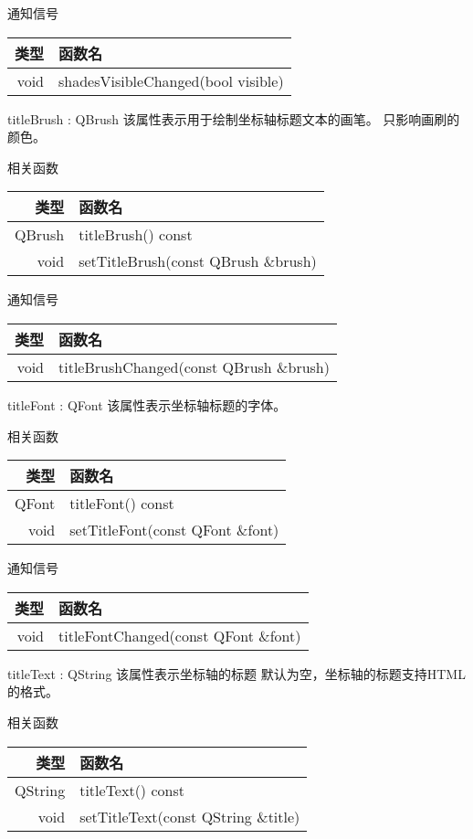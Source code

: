 通知信号

\begin{tabular}{|r|l|}
\hline
类型&函数名\\ 
\hline
void& 	shadesVisibleChanged(bool visible)\\
\hline
\end{tabular}

\splitLine 

titleBrush : QBrush 该属性表示用于绘制坐标轴标题文本的画笔。 只影响画刷的颜色。

相关函数

\begin{tabular}{|r|l|}
\hline
类型&函数名\\ 
\hline
QBrush	&titleBrush() const\\
\hline
void & setTitleBrush(const QBrush \&brush)\\
\hline
\end{tabular}

通知信号

\begin{tabular}{|r|l|}
\hline
类型&函数名\\ 
\hline
void & titleBrushChanged(const QBrush \&brush)\\
\hline
\end{tabular}

\splitLine 

titleFont : QFont 该属性表示坐标轴标题的字体。

相关函数

\begin{tabular}{|r|l|}
\hline
类型&函数名\\ 
\hline
QFont&	titleFont() const\\
\hline
void & setTitleFont(const QFont \&font)\\
\hline
\end{tabular}

通知信号

\begin{tabular}{|r|l|}
\hline
类型&函数名\\ 
\hline
void & titleFontChanged(const QFont \&font)\\
\hline
\end{tabular}

\splitLine

titleText : QString 该属性表示坐标轴的标题 默认为空，坐标轴的标题支持HTML的格式。

相关函数

\begin{tabular}{|r|l|}
\hline
类型&函数名\\ 
\hline
QString & titleText() const\\ 
\hline
void & setTitleText(const QString \&title)\\
\hline
\end{tabular}

